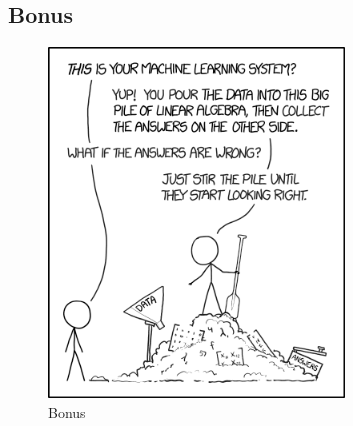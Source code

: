 \begin{appendices}
    \chapter{Bonus}
    \begin{figure}[ht]
        \centering
        \includegraphics[width=0.7\textwidth]{images/bonus.png}
        \caption{Bonus}
        \label{appendix:bonus}
    \end{figure}

\end{appendices}